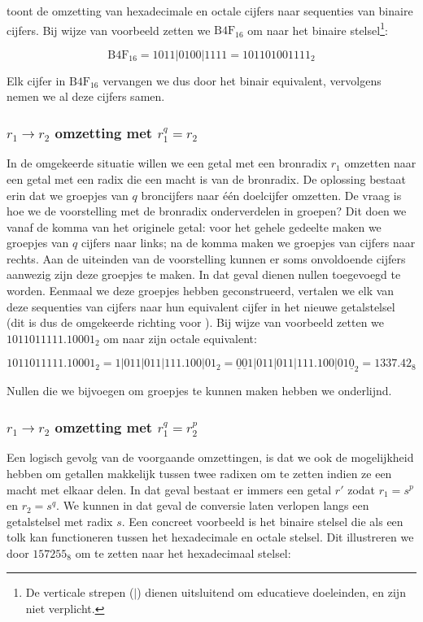  toont de omzetting van hexadecimale en octale cijfers naar sequenties van binaire cijfers. Bij wijze van voorbeeld zetten we $\mbox{B4F}_{16}$ om naar het binaire stelsel\footnote{De verticale strepen ($|$) dienen uitsluitend om educatieve doeleinden, en zijn niet verplicht.}:

\begin{equation}
\mbox{B4F}_{16}=1011|0100|1111=101101001111_2
\end{equation}

Elk cijfer in $\mbox{B4F}_{16}$ vervangen we dus door het binair equivalent, vervolgens nemen we al deze cijfers samen.

\subsubsection{$r_1\rightarrow r_2$ omzetting met $r_1^q=r_2$}
In de omgekeerde situatie willen we een getal met een bronradix $r_1$ omzetten naar een getal met een radix die een macht is van de bronradix. De oplossing bestaat erin dat we groepjes van $q$ broncijfers naar \'e\'en doelcijfer omzetten. De vraag is hoe we de voorstelling met de bronradix onderverdelen in groepen? Dit doen we vanaf de komma van het originele getal: voor het gehele gedeelte maken we groepjes van $q$ cijfers naar links; na de komma maken we groepjes van cijfers naar rechts. Aan de uiteinden van de voorstelling kunnen er soms onvoldoende cijfers aanwezig zijn deze groepjes te maken. In dat geval dienen nullen toegevoegd te worden. Eenmaal we deze groepjes hebben geconstrueerd, vertalen we elk van deze sequenties van cijfers naar hun equivalent cijfer in het nieuwe getalstelsel (dit is dus de omgekeerde richting voor ). Bij wijze van voorbeeld zetten we $1011011111.10001_2$ om naar zijn octale equivalent:

\begin{equation}
1011011111.10001_2=1|011|011|111.100|01_2=\underline0\underline01|011|011|111.100|01\underline0_2=1337.42_8
\end{equation}

Nullen die we bijvoegen om groepjes te kunnen maken hebben we onderlijnd.

\subsubsection{$r_1\rightarrow r_2$ omzetting met $r_1^q=r_2^p$}
Een logisch gevolg van de voorgaande omzettingen, is dat we ook de mogelijkheid hebben om getallen makkelijk tussen twee radixen om te zetten indien ze een macht met elkaar delen. In dat geval bestaat er immers een getal $r'$ zodat $r_1=s^p$ en $r_2=s^q$. We kunnen in dat geval de conversie laten verlopen langs een getalstelsel met radix $s$. Een concreet voorbeeld is het binaire stelsel die als een tolk kan functioneren tussen het hexadecimale en octale stelsel. Dit illustreren we door $157255_8$ om te zetten naar het hexadecimaal stelsel:

